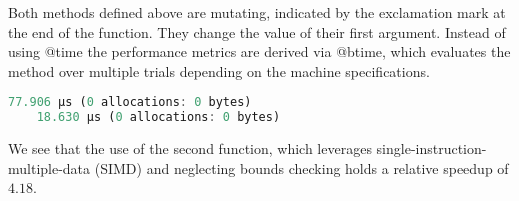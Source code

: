 

Both methods defined above are mutating, indicated by the exclamation mark at the end of the function. They change the value of their first argument.
Instead of using @time the performance metrics are derived via @btime, which evaluates the method over multiple trials depending on the machine specifications.

\begin{lstlisting}[language=Julia]
    77.906 μs (0 allocations: 0 bytes)
    18.630 μs (0 allocations: 0 bytes)
\end{lstlisting}

We see that the use of the second function, which leverages single-instruction-multiple-data (SIMD) and neglecting bounds checking holds a relative speedup of $4.18$.















